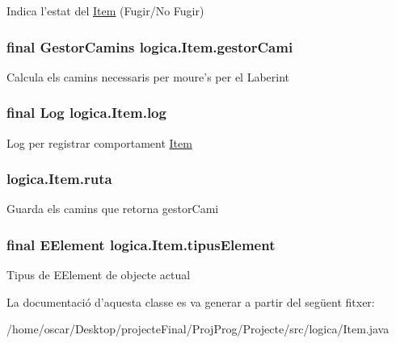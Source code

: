 Indica l'estat del \hyperlink{classlogica_1_1_item}{Item} (Fugir/\+No Fugir) \hypertarget{classlogica_1_1_item_a493a6d454882564c734d0f625ae7998b}{
\subsubsection[{gestor\+Cami}]{\setlength{\rightskip}{0pt plus 5cm}final {\bf Gestor\+Camins} logica.\+Item.\+gestor\+Cami\hspace{0.3cm}{\ttfamily [private]}}}\label{classlogica_1_1_item_a493a6d454882564c734d0f625ae7998b}
Calcula els camins necessaris per moure's per el Laberint \hypertarget{classlogica_1_1_item_a4da66ecee5634f9dba9015ed82f1ded5}{
\subsubsection[{log}]{\setlength{\rightskip}{0pt plus 5cm}final {\bf Log} logica.\+Item.\+log\hspace{0.3cm}{\ttfamily [private]}}}\label{classlogica_1_1_item_a4da66ecee5634f9dba9015ed82f1ded5}
Log per registrar comportament \hyperlink{classlogica_1_1_item}{Item} \hypertarget{classlogica_1_1_item_aad60c443c720c3c976474593dec685cc}{
\subsubsection[{ruta}]{ logica.\+Item.\+ruta\hspace{0.3cm}{\ttfamily [private]}}}\label{classlogica_1_1_item_aad60c443c720c3c976474593dec685cc}
Guarda els camins que retorna gestor\+Cami \hypertarget{classlogica_1_1_item_a8f4061141a64a72969be035b8d689fb9}{
\subsubsection[{tipus\+Element}]{\setlength{\rightskip}{0pt plus 5cm}final {\bf E\+Element} logica.\+Item.\+tipus\+Element\hspace{0.3cm}{\ttfamily [private]}}}\label{classlogica_1_1_item_a8f4061141a64a72969be035b8d689fb9}
Tipus de E\+Element de objecte actual 

La documentació d'aquesta classe es va generar a partir del següent fitxer\+:\begin{DoxyCompactItemize}
\item 
/home/oscar/\+Desktop/projecte\+Final/\+Proj\+Prog/\+Projecte/src/logica/Item.\+java\end{DoxyCompactItemize}
